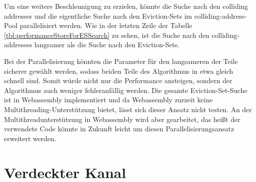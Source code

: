 
Um eine weitere Beschleunigung zu erzielen, könnte die Suche nach den colliding addresses und die eigentliche Suche nach den Eviction-Sets im colliding-address-Pool parallelisiert werden. Wie in der letzten Zeile der Tabelle \ref{tbl:performanceStoreForESSearch} zu sehen, ist die Suche nach den colliding-addresses langsamer als die Suche nach den Eviction-Sets.

Bei der Parallelisierung könnten die Parameter für den langsameren der Teile sicherer gewählt werden, sodass beiden Teile des Algorithmus in etwa gleich schnell sind.
Somit würde nicht nur die Performance ansteigen, sondern der Algorithmus auch weniger fehleranfällig werden.
Die gesamte Eviction-Set-Suche ist in Webassembly implementiert und da Webassembly zurzeit keine Multithreading-Unterstützung \cite{WebassemblyThreads} bietet, lässt sich dieser Ansatz nicht testen.
An der Multithreadunterstützung in Webassembly wird aber gearbeitet, das heißt der verwendete Code könnte in Zukunft leicht um diesen Parallelisierungsansatz erweitert werden.

\section{Verdeckter Kanal}

